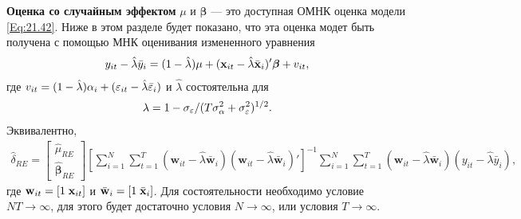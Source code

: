 \textbf{Оценка со случайным эффектом} $\mu$ и $\bm\beta$ --- это доступная ОМНК оценка модели \ref{Eq:21.42}. Ниже в этом разделе будет показано, что эта оценка модет быть получена с помощью МНК оценивания измененного уравнения
 \begin{align}
y_{it}-\hat{\lambda}\bar{y}_i=(1-\hat{\lambda})\mu+(\mathbf{x}_{it}-\hat{\lambda}\bar{\mathbf{x}}_i)'\bm\beta+v_{it},
\label{Eq:21.43}
\end{align}
где $v_{it}=(1-\hat{\lambda})\alpha_i+(\varepsilon_{it}-\hat{\lambda}\bar{\varepsilon}_i)$ и $\hat{\lambda}$ состоятельна для 
 \begin{align}
\lambda=1-\sigma_\varepsilon/(T\sigma^2_{\alpha}+\sigma^2_\varepsilon)^{1/2}.
\label{Eq:21.44}
\end{align}
Эквивалентно,
 \begin{align}
\hat{\delta}_{RE}=
\begin{bmatrix}
 \hat{\mu}_{RE} \\ \hat{\bm\beta}_{RE}
\end{bmatrix}
\left[ \sum^N_{i=1} \sum^T_{t=1} (\mathbf w_{it}  -\hat{\lambda} \bar{\mathbf w}_i)
 (\mathbf w_{it}  -\hat{\lambda} \bar{\mathbf w}_i)' \right]^{-1}
\sum^N_{i=1} \sum^T_{t=1} (\mathbf w_{it}  -\hat{\lambda} \bar{\mathbf w}_i)(y_{it}-\hat{\lambda}\bar{y}_i),
\label{Eq:21.45}
\end{align}
где $\mathbf w_{it}=[1 \; \mathbf{x}_{it}]$ и $\bar{\mathbf w}_i=[1\; \bar{\mathbf{x}}_i]$. Для состоятельности необходимо условие $NT \rightarrow \infty$, для этого будет достаточно условия $N \rightarrow \infty$, или условия $T \rightarrow \infty$.

